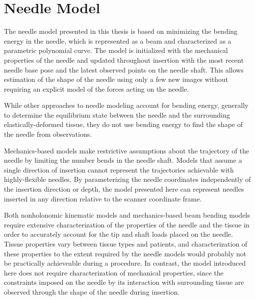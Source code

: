 \chapter{Needle Model}
\label{sec:needlemodel} %

The needle model presented in this thesis is based on minimizing the bending energy in the needle, which is represented as a beam and characterized as a parametric polynomial curve. The model is initialized with the mechanical properties of the needle and updated throughout insertion with the most recent needle base pose and the latest observed points on the needle shaft. This allows estimation of the shape of the needle using only a few new images without requiring an explicit model of the forces acting on the needle.

While other approaches to needle modeling account for bending energy, generally to determine the equilibrium state between the needle and the surrounding elastically-deformed tissue\cite{roesthuis_modeling_2015, misra_mechanics_2010, abayazid_integrating_2013}, they do not use bending energy to find the shape of the needle from observations.

Mechanics-based models make restrictive assumptions about the trajectory of the needle by limiting the number bends in the needle shaft\cite{abayazid_integrating_2013}. Models that assume a single direction of insertion\cite{roesthuis_mechanics-based_2012, abayazid_integrating_2013} cannot represent the trajectories achievable with highly-flexible needles. By parameterizing the needle coordinates independently of the insertion direction or depth, the model presented here can represent needles inserted in any direction relative to the scanner coordinate frame.

Both nonholonomic kinematic models\cite{webster_nonholonomic_2006, reed_modeling_2009, swensen_torsional_2014} and mechanics-based beam bending models\cite{roesthuis_mechanics-based_2012, abayazid_integrating_2013} require extensive characterization of the properties of the needle and the tissue in order to accurately account for the tip and shaft loads placed on the needle. Tissue properties vary between tissue types and patients, and characterization of these properties to the extent required by the needle models would probably not be practically achieveable during a procedure. In contrast, the model introduced here does not require characterization of mechanical properties, since the constraints imposed on the needle by its interaction with surrounding tissue are observed through the shape of the needle during insertion.

